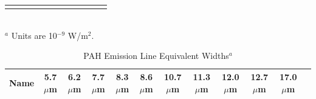 \documentclass[useAMS,usenatbib,a4paper]{mn2e}
\begin{document}
\begin{table}
\begin{minipage}{200mm}
\begin{tabular}{l c c  c  c  c  c  c  c  c  c c }
\hline
 \label{PAHlinetable}
\end{tabular}\\
{$^a$ Units are 10$^{-9}$ W/m$^2$.}
\end{minipage}
\end{table}







\begin{table}
 \centering
 \begin{minipage}{200mm}
\caption{PAH Emission Line Equivalent Widths$^a$}
  \begin{tabular}{l c c  c  c  c  c  c  c  c  c c }
  \hline {Name  }&{5.7$\mu$m  }&{6.2$\mu$m  }&{7.7$\mu$m  }&{8.3$\mu$m  }&{8.6$\mu$m  }&{10.7$\mu$m  }&{11.3$\mu$m  }&{12.0$\mu$m  }&{12.7$\mu$m  }&{17.0$\mu$m  } 
   \\
 \hline




\end{tabular}
\end{minipage}
\end{table}
\end{document}
